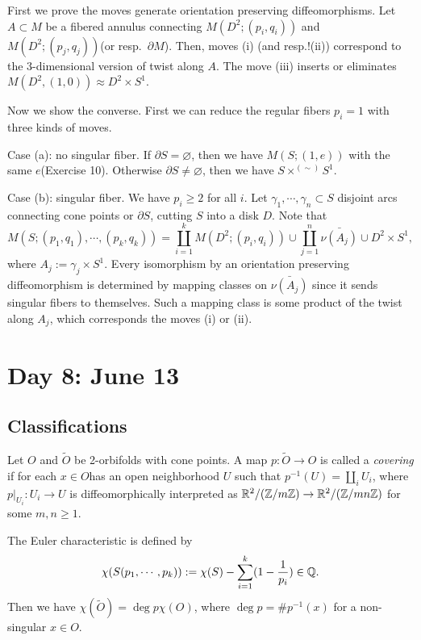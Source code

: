 \documentclass{../../../small}
\begin{document}
\begin{pf}
First we prove the moves generate orientation preserving diffeomorphisms.
Let $A\subset M$ be a fibered annulus connecting $M(D^2;(p_i,q_i))$ and $M(D^2;(p_j,q_j))$(or resp.~$\partial M$).
Then, moves (i) (and resp.!(ii)) correspond to the 3-dimensional version of twist along $A$.
The move (iii) inserts or eliminates $M(D^2,(1,0))\approx D^2\times S^1$.

Now we show the converse.
First we can reduce the regular fibers $p_i=1$ with three kinds of moves.

Case (a): no singular fiber.
If $\partial S=\varnothing$, then we have $M(S;(1,e))$ with the same $e$(Exercise 10).
Otherwise $\partial S\ne\varnothing$, then we have $S\times^{(\sim)}S^1$.

Case (b): singular fiber.
We have $p_i\ge2$ for all $i$.
Let $\gamma_1,\cdots,\gamma_n\subset S$ disjoint arcs connecting cone points or $\partial S$, cutting $S$ into a disk $D$.
Note that
\[M(S;(p_1,q_1),\cdots,(p_k,q_k))=\coprod_{i=1}^kM(D^2;(p_i,q_i))\cup\coprod_{j=1}^n\bar{\nu(A_j)}\cup D^2\times S^1,\]
where $A_j:=\gamma_j\times S^1$.
Every isomorphism by an orientation preserving diffeomorphism is determined by mapping classes on $\bar{\nu(A_j)}$ since it sends singular fibers to themselves.
Such a mapping class is some product of the twist along $A_j$, which corresponds the moves (i) or (ii).
\end{pf}

\newpage
\setcounter{section}{7}
\section{Day 8: June 13}
\setcounter{section}{6}
\setcounter{subsection}{1}
\subsection{Classifications}
\setcounter{thm}{3}


Let $O$ and $\tilde O$ be 2-orbifolds with cone points.
A map $p:\tilde O\to O$ is called a \emph{covering} if for each $x\in O$has an open neighborhood $U$ such that $p^{-1}(U)=\coprod_i U_i$, where $p|_{U_i}:U_i\to U$ is diffeomorphically interpreted as $\mathbb{R}^2/(\mathbb{Z}/m\mathbb{Z})\to\mathbb{R}^2/(\mathbb{Z}/mn\mathbb{Z})$ for some $m,n\ge1$.

The Euler characteristic is defined by
\[\chi(S(p_1,\cdots,p_k)):=\chi(S)-\sum_{i=1}^k(1-\frac1{p_i})\in\mathbb{Q}.\]
Then we have $\chi(\tilde O)=\deg p\chi(O)$, where $\deg p=\# p^{-1}(x)$ for a non-singular $x\in O$.
\end{document}

